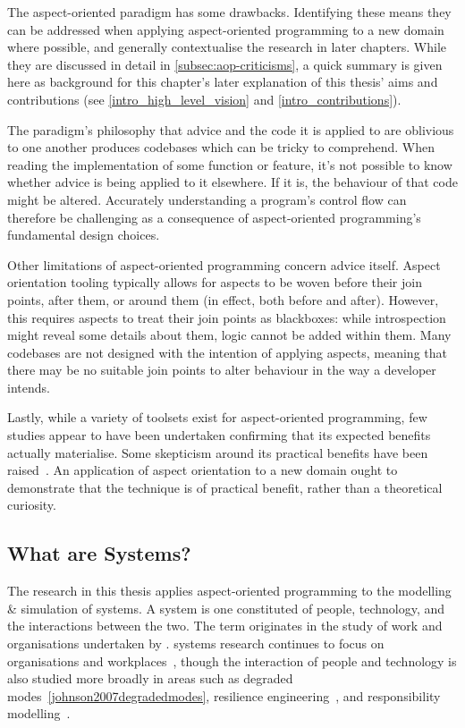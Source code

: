The aspect-oriented paradigm has some drawbacks. Identifying these means they
can be addressed when applying aspect-oriented programming to a new domain where
possible, and generally contextualise the research in later chapters. While they
are discussed in detail in \cref{subsec:aop-criticisms}, a quick summary is
given here as background for this chapter's later explanation of this thesis'
aims and contributions (see \cref{intro_high_level_vision} and
\cref{intro_contributions}).

The paradigm's philosophy that advice and the code it is applied to are
oblivious to one another produces codebases which can be tricky to comprehend.
When reading the implementation of some function or feature, it's not possible
to know whether advice is being applied to it elsewhere. If it is, the behaviour
of that code might be altered. Accurately understanding a program's control flow
can therefore be challenging as a consequence of aspect-oriented programming's
fundamental design choices.

Other limitations of aspect-oriented programming concern advice itself. Aspect
orientation tooling typically allows for aspects to be woven before their join
points, after them, or around them (in effect, both before and after). However,
this requires aspects to treat their join points as blackboxes: while
introspection might reveal some details about them, logic cannot be added within
them. Many codebases are not designed with the intention of applying aspects,
meaning that there may be no suitable join points to alter behaviour in the way
a developer intends.

Lastly, while a variety of toolsets exist for aspect-oriented programming, few
studies appear to have been undertaken confirming that its expected benefits
actually materialise. Some skepticism around its practical benefits have been
raised~\cite{steimann06paradoxical,przybylek2010wrong,Constantinides04aopconsidered}.
An application of aspect orientation to a new domain ought to demonstrate
that the technique is of practical benefit, rather than a theoretical curiosity.



\subsection{What are \SocioTechnical Systems?}

The research in this thesis applies aspect-oriented programming to the modelling
\& simulation of \sociotechnical systems. A \sociotechnical system is one
constituted of people, technology, and the interactions between the two. The
term originates in the study of work and organisations undertaken by
\citet{trist1951sociotechnical}. \Sociotechnical systems research continues to
focus on organisations and
workplaces~\cite{pasmore2019reflections,baxter2011socio}, though the interaction
of people and technology is also studied more broadly in areas such as degraded
modes~\cref{johnson2007degradedmodes}, resilience
engineering~\cite{hollnagel2006resilience}, and responsibility
modelling~\cite{lock2009responsibility}.

